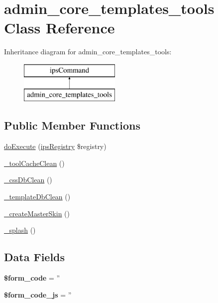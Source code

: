 \hypertarget{classadmin__core__templates__tools}{\section{admin\-\_\-core\-\_\-templates\-\_\-tools Class Reference}
\label{classadmin__core__templates__tools}
}
Inheritance diagram for admin\-\_\-core\-\_\-templates\-\_\-tools\-:\begin{figure}[H]
\begin{center}
\leavevmode
\includegraphics[height=2.000000cm]{classadmin__core__templates__tools}
\end{center}
\end{figure}
\subsection*{Public Member Functions}
\begin{DoxyCompactItemize}
\item 
\hyperlink{classadmin__core__templates__tools_afbc4e912a0604b94d47d66744c64d8ba}{do\-Execute} (\hyperlink{classips_registry}{ips\-Registry} \$registry)
\item 
\hyperlink{classadmin__core__templates__tools_aed8ee2a7e843a453dee1acb9164506a2}{\-\_\-tool\-Cache\-Clean} ()
\item 
\hyperlink{classadmin__core__templates__tools_a63ddbd91650826f4868ed37b2b4ada73}{\-\_\-css\-Db\-Clean} ()
\item 
\hyperlink{classadmin__core__templates__tools_a57bd463653da0d148bf3dc67fdd1f12d}{\-\_\-template\-Db\-Clean} ()
\item 
\hyperlink{classadmin__core__templates__tools_af5a57941cc0198223e10bddd7c00749b}{\-\_\-create\-Master\-Skin} ()
\item 
\hyperlink{classadmin__core__templates__tools_ac4bed2f4037aad4531fd761c36b35dfc}{\-\_\-splash} ()
\end{DoxyCompactItemize}
\subsection*{Data Fields}
\begin{DoxyCompactItemize}
\item 
\hypertarget{classadmin__core__templates__tools_af28aee726fa3eb6c355d08a2ab655e03}{{\bfseries \$form\-\_\-code} = ''}\label{classadmin__core__templates__tools_af28aee726fa3eb6c355d08a2ab655e03}

\item 
\hypertarget{classadmin__core__templates__tools_ac68fe8a02a2efd63c3271179f4b4fbb7}{{\bfseries \$form\-\_\-code\-\_\-js} = ''}\label{classadmin__core__templates__tools_ac68fe8a02a2efd63c3271179f4b4fbb7}

\end{DoxyCompactItemize}

